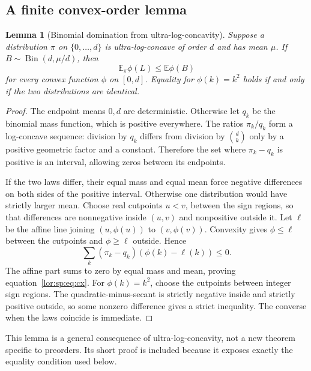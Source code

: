 \documentclass[11pt]{article}
\numberwithin{equation}{section}
\newtheorem{lemma}[theorem]{Lemma}
\theoremstyle{definition}
\newcommand{\EE}{\mathbb E}
\begin{document}
\subsection{A finite convex-order lemma}
\begin{lemma}[Binomial domination from ultra-log-concavity]
\label{lor:sp:lem:convexorder}
Suppose a distribution $\pi$ on $\{0,\ldots,d\}$ is ultra-log-concave of order
$d$ and has mean $\mu$. If $B\sim\operatorname{Bin}(d,\mu/d)$, then
\begin{equation}
 \EE_\pi\phi(L)\le\EE\phi(B)
 \label{lor:sp:eq:cx}
\end{equation}
for every convex function $\phi$ on $[0,d]$. Equality for $\phi(k)=k^2$
holds if and only if the two distributions are identical.
\end{lemma}
\begin{proof}
The endpoint means $0,d$ are deterministic. Otherwise let $q_k$ be the
binomial mass function, which is positive everywhere. The ratios
$\pi_k/q_k$ form a log-concave sequence: division by $q_k$ differs from division
by $\binom d k$ only by a positive geometric factor and a constant. Therefore
the set where $\pi_k-q_k$ is positive is an interval, allowing zeros between
its endpoints.

If the two laws differ, their equal mass and equal mean force negative
differences on both sides of the positive interval. Otherwise one distribution
would have strictly larger mean. Choose real cutpoints $u<v$, between the
sign regions, so that differences are nonnegative inside $(u,v)$ and
nonpositive outside it. Let $\ell$ be the affine line joining
$(u,\phi(u))$ to $(v,\phi(v))$. Convexity gives $\phi\le\ell$ between the
cutpoints and $\phi\ge\ell$ outside. Hence
\[
 \sum_k(\pi_k-q_k)(\phi(k)-\ell(k))\le0.
\]
The affine part sums to zero by equal mass and mean, proving equation~\eqref{lor:sp:eq:cx}.
For $\phi(k)=k^2$, choose the cutpoints between integer sign regions. The
quadratic-minus-secant is strictly negative inside and strictly positive
outside, so some nonzero difference gives a strict inequality. The converse
when the laws coincide is immediate.
\end{proof}

This lemma is a general consequence of ultra-log-concavity, not a new theorem
specific to preorders. Its short proof is included because it exposes exactly
the equality condition used below.
\end{document}
